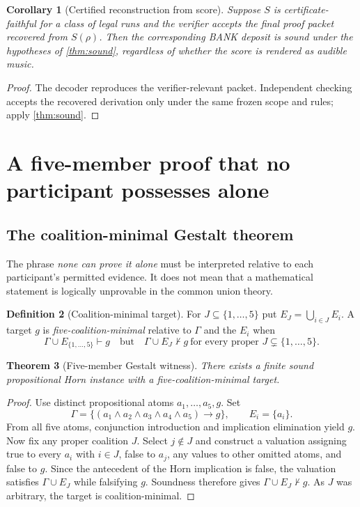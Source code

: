 \documentclass[11pt,letterpaper]{article}
\newtheorem{theorem}{Theorem}[section]
\newtheorem{corollary}[theorem]{Corollary}
\theoremstyle{definition}
\newtheorem{definition}[theorem]{Definition}
\theoremstyle{remark}
\begin{document}
\begin{corollary}[Certified reconstruction from score]\label{cor:score}
Suppose $S$ is certificate-faithful for a class of legal runs and the verifier accepts the final proof packet recovered from $S(\rho)$. Then the corresponding BANK deposit is sound under the hypotheses of \cref{thm:sound}, regardless of whether the score is rendered as audible music.
\end{corollary}
\begin{proof}
The decoder reproduces the verifier-relevant packet. Independent checking accepts the recovered derivation only under the same frozen scope and rules; apply \cref{thm:sound}.
\end{proof}

\section{A five-member proof that no participant possesses alone}
\subsection{The coalition-minimal Gestalt theorem}
The phrase \emph{none can prove it alone} must be interpreted relative to each participant's permitted evidence. It does not mean that a mathematical statement is logically unprovable in the common union theory.

\begin{definition}[Coalition-minimal target]
For $J\subseteq\{1,\ldots,5\}$ put $E_J=\bigcup_{i\in J}E_i$. A target $g$ is \emph{five-coalition-minimal} relative to $\Gamma$ and the $E_i$ when
\[
\Gamma\cup E_{\{1,\ldots,5\}}\vdash g
\quad\text{but}\quad
\Gamma\cup E_J\not\vdash g\ \text{for every proper }J\subsetneq\{1,\ldots,5\}.
\]
\end{definition}

\begin{theorem}[Five-member Gestalt witness]\label{thm:gestalt}
There exists a finite sound propositional Horn instance with a five-coalition-minimal target.
\end{theorem}
\begin{proof}
Use distinct propositional atoms $a_1,\ldots,a_5,g$. Set
\begin{equation}\label{eq:horn}
\Gamma=\{(a_1\wedge a_2\wedge a_3\wedge a_4\wedge a_5)\to g\},
\qquad E_i=\{a_i\}.
\end{equation}
From all five atoms, conjunction introduction and implication elimination yield $g$. Now fix any proper coalition $J$. Select $j\notin J$ and construct a valuation assigning true to every $a_i$ with $i\in J$, false to $a_j$, any values to other omitted atoms, and false to $g$. Since the antecedent of the Horn implication is false, the valuation satisfies $\Gamma\cup E_J$ while falsifying $g$. Soundness therefore gives $\Gamma\cup E_J\not\vdash g$. As $J$ was arbitrary, the target is coalition-minimal.
\end{proof}
\end{document}

